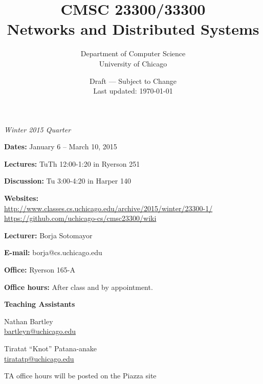 \documentclass[11pt]{article}
\title{CMSC 23300/33300\\Networks and Distributed Systems}
\author{Department of Computer Science\\University of Chicago}
\date{{\color{red} Draft --- Subject to Change}\\Last updated: \today}
\begin{document}
\maketitle
\thispagestyle{empty}

\begin{center}
\begin{minipage}{0.6\textwidth}
\begin{center}
\emph{Winter 2015 Quarter}
\end{center}
\textbf{Dates:} January 6 -- March 10, 2015

\textbf{Lectures:} TuTh 12:00-1:20 in Ryerson 251

\textbf{Discussion:} Tu 3:00-4:20 in Harper 140

\textbf{Websites:}\\
 \url{http://www.classes.cs.uchicago.edu/archive/2015/winter/23300-1/}\\
 \url{https://github.com/uchicago-cs/cmsc23300/wiki}
\
\vspace{1em}

\textbf{Lecturer:} Borja Sotomayor

\textbf{E-mail:} borja@cs.uchicago.edu

\textbf{Office:} Ryerson 165-A

\textbf{Office hours:} After class and by appointment.

\end{minipage}

\vspace{2ex}
\textbf{Teaching Assistants}
\vspace{1ex}

\begin{minipage}[t]{0.35\textwidth}
\begin{center}
Nathan Bartley\\\url{bartleyn@uchicago.edu}
\end{center}
\end{minipage}
\hspace{1ex}
\begin{minipage}[t]{0.35\textwidth}
\begin{center}
Tiratat ``Knot'' Patana-anake\\\url{tiratatp@uchicago.edu}
\end{center}
\end{minipage}

\vspace{1ex}

TA office hours will be posted on the Piazza site

\end{center}
\end{document}
